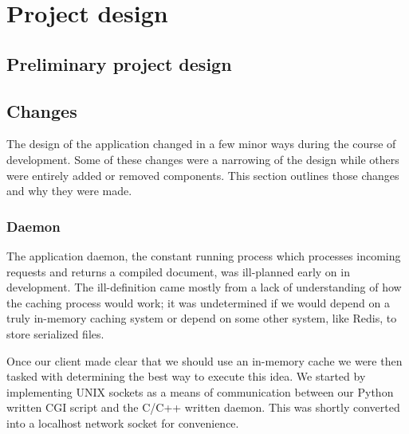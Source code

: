 \section{Project design}

\subsection{Preliminary project design}




\subsection{Changes}

The design of the application changed in a few minor ways during the course of development.
Some of these changes were a narrowing of the design while others were entirely added or removed components.
This section outlines those changes and why they were made.

\subsubsection{Daemon}

The application daemon, the constant running process which processes incoming requests and returns a compiled document, was ill-planned early on in development.
The ill-definition came mostly from a lack of understanding of how the caching process would work; it was undetermined if we would depend on a truly in-memory caching system or depend on some other system, like Redis, to store serialized files.

Once our client made clear that we should use an in-memory cache we were then tasked with determining the best way to execute this idea.
We started by implementing UNIX sockets as a means of communication between our Python written CGI script and the C/C++ written daemon.
This was shortly converted into a localhost network socket for convenience.


